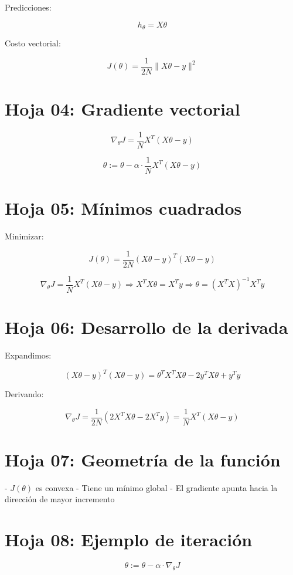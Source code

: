 \documentclass[12pt]{article}
\begin{document}
Predicciones:

\[
h_\theta = X \theta
\]

Costo vectorial:

\[
J(\theta) = \frac{1}{2N} \| X\theta - y \|^2
\]

\section*{Hoja 04: Gradiente vectorial}

\[
\nabla_\theta J = \frac{1}{N} X^T (X \theta - y)
\]

\[
\theta := \theta - \alpha \cdot \frac{1}{N} X^T (X \theta - y)
\]

\section*{Hoja 05: Mínimos cuadrados}

Minimizar:

\[
J(\theta) = \frac{1}{2N} (X \theta - y)^T (X \theta - y)
\]

\[
\nabla_\theta J = \frac{1}{N} X^T (X \theta - y)
\Rightarrow X^T X \theta = X^T y
\Rightarrow \theta = (X^T X)^{-1} X^T y
\]

\section*{Hoja 06: Desarrollo de la derivada}

Expandimos:

\[
(X \theta - y)^T (X \theta - y) = \theta^T X^T X \theta - 2 y^T X \theta + y^T y
\]

Derivando:

\[
\nabla_\theta J = \frac{1}{2N} (2 X^T X \theta - 2 X^T y)
= \frac{1}{N} X^T (X \theta - y)
\]

\section*{Hoja 07: Geometría de la función}

- \( J(\theta) \) es convexa
- Tiene un mínimo global
- El gradiente apunta hacia la dirección de mayor incremento

\section*{Hoja 08: Ejemplo de iteración}

\[
\theta := \theta - \alpha \cdot \nabla_\theta J
\]
\end{document}
